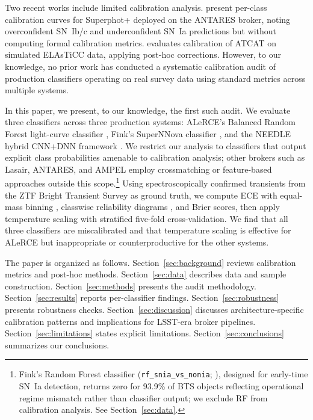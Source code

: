 \documentclass[twocolumn]{aastex631}
\begin{document}
Two recent works include limited calibration analysis.
\citet{desoto2024} present per-class calibration curves for Superphot+
deployed on the ANTARES broker, noting overconfident SN~Ib/c and
underconfident SN~Ia predictions but without computing formal calibration
metrics. \citet{tung2025} evaluates calibration of ATCAT on simulated
ELAsTiCC data, applying post-hoc corrections. However, to our knowledge,
no prior work has conducted a systematic calibration audit of production
classifiers operating on real survey data using standard metrics across
multiple systems.

In this paper, we present, to our knowledge, the first such audit.
We evaluate three classifiers across three production systems:
ALeRCE's Balanced Random Forest light-curve classifier
\citep[\texttt{lc\_classifier\_v1.1.13};][]{sanchezsaez2021},
Fink's SuperNNova classifier \citep{moller2020}, and the NEEDLE
hybrid CNN+DNN framework \citep{sheng2024}. We restrict our
analysis to classifiers that output explicit class probabilities
amenable to calibration analysis; other brokers such as Lasair,
ANTARES, and AMPEL employ crossmatching or feature-based approaches
outside this scope.\footnote{Fink's Random Forest classifier
(\texttt{rf\_snia\_vs\_nonia}; \citealt{leoni2022}), designed for
early-time SN~Ia detection, returns zero for 93.9\% of BTS objects
reflecting operational regime mismatch rather than classifier output;
we exclude RF from calibration analysis. See Section~\ref{sec:data}.}
Using spectroscopically confirmed transients from the ZTF Bright
Transient Survey \citep[BTS;][]{fremling2020, perley2020} as ground
truth, we compute ECE with equal-mass binning \citep{roelofs2022},
classwise reliability diagrams \citep{nixon2019}, and Brier scores,
then apply temperature scaling with stratified five-fold
cross-validation. We find that all three classifiers are miscalibrated
and that temperature scaling is effective for ALeRCE but inappropriate
or counterproductive for the other systems.

The paper is organized as follows. Section~\ref{sec:background}
reviews calibration metrics and post-hoc methods.
Section~\ref{sec:data} describes data and sample construction.
Section~\ref{sec:methods} presents the audit methodology.
Section~\ref{sec:results} reports per-classifier findings.
Section~\ref{sec:robustness} presents robustness checks.
Section~\ref{sec:discussion} discusses architecture-specific
calibration patterns and implications for LSST-era broker pipelines.
Section~\ref{sec:limitations} states explicit limitations.
Section~\ref{sec:conclusions} summarizes our conclusions.
\end{document}
